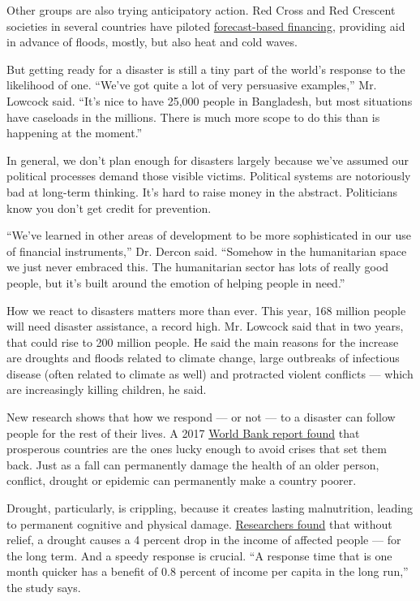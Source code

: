 Other groups are also trying anticipatory action. Red Cross and Red
Crescent societies in several countries have piloted
\href{https://www.forecast-based-financing.org/}{forecast-based
financing}, providing aid in advance of floods, mostly, but also heat
and cold waves.

But getting ready for a disaster is still a tiny part of the world's
response to the likelihood of one. ``We've got quite a lot of very
persuasive examples,'' Mr. Lowcock said. ``It's nice to have 25,000
people in Bangladesh, but most situations have caseloads in the
millions. There is much more scope to do this than is happening at the
moment.''

In general, we don't plan enough for disasters largely because we've
assumed our political processes demand those visible victims. Political
systems are notoriously bad at long-term thinking. It's hard to raise
money in the abstract. Politicians know you don't get credit for
prevention.

``We've learned in other areas of development to be more sophisticated
in our use of financial instruments,'' Dr. Dercon said. ``Somehow in the
humanitarian space we just never embraced this. The humanitarian sector
has lots of really good people, but it's built around the emotion of
helping people in need.''

How we react to disasters matters more than ever. This year, 168 million
people will need disaster assistance, a record high. Mr. Lowcock said
that in two years, that could rise to 200 million people. He said the
main reasons for the increase are droughts and floods related to climate
change, large outbreaks of infectious disease (often related to climate
as well) and protracted violent conflicts --- which are increasingly
killing children, he said.

New research shows that how we respond --- or not --- to a disaster can
follow people for the rest of their lives. A 2017
\href{https://www.worldbank.org/en/publication/wdr2017}{World Bank
report found} that prosperous countries are the ones lucky enough to
avoid crises that set them back. Just as a fall can permanently damage
the health of an older person, conflict, drought or epidemic can
permanently make a country poorer.

Drought, particularly, is crippling, because it creates lasting
malnutrition, leading to permanent cognitive and physical damage.
\href{http://documents.worldbank.org/curated/en/796341557483493173/The-Chronology-of-a-Disaster-A-Review-and-Assessment-of-the-Value-of-Acting-Early-on-Household-Welfare}{Researchers
found} that without relief, a drought causes a 4 percent drop in the
income of affected people --- for the long term. And a speedy response
is crucial. ``A response time that is one month quicker has a benefit of
0.8 percent of income per capita in the long run,'' the study says.

